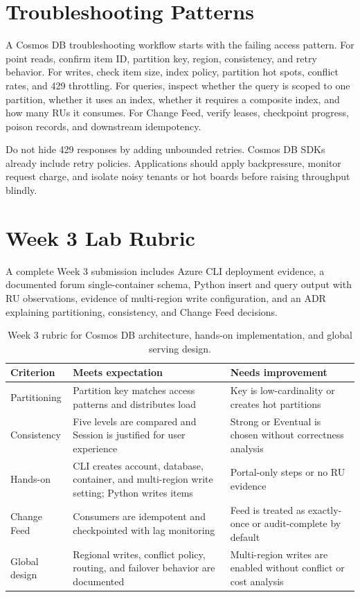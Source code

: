 \section{Troubleshooting Patterns}
A Cosmos DB troubleshooting workflow starts with the failing access pattern. For point reads, confirm item ID, partition key, region, consistency, and retry behavior. For writes, check item size, index policy, partition hot spots, conflict rates, and 429 throttling. For queries, inspect whether the query is scoped to one partition, whether it uses an index, whether it requires a composite index, and how many RUs it consumes. For Change Feed, verify leases, checkpoint progress, poison records, and downstream idempotency.

Do not hide 429 responses by adding unbounded retries. Cosmos DB SDKs already include retry policies. Applications should apply backpressure, monitor request charge, and isolate noisy tenants or hot boards before raising throughput blindly.

\section{Week 3 Lab Rubric}
A complete Week 3 submission includes Azure CLI deployment evidence, a documented forum single-container schema, Python insert and query output with RU observations, evidence of multi-region write configuration, and an ADR explaining partitioning, consistency, and Change Feed decisions.

\begin{table}[H]
\centering
\small
\begin{tabular}{@{}p{3.0cm}p{5.0cm}p{5.0cm}@{}}
\toprule
\textbf{Criterion} & \textbf{Meets expectation} & \textbf{Needs improvement} \\
\midrule
Partitioning & Partition key matches access patterns and distributes load & Key is low-cardinality or creates hot partitions \\
Consistency & Five levels are compared and Session is justified for user experience & Strong or Eventual is chosen without correctness analysis \\
Hands-on & CLI creates account, database, container, and multi-region write setting; Python writes items & Portal-only steps or no RU evidence \\
Change Feed & Consumers are idempotent and checkpointed with lag monitoring & Feed is treated as exactly-once or audit-complete by default \\
Global design & Regional writes, conflict policy, routing, and failover behavior are documented & Multi-region writes are enabled without conflict or cost analysis \\
\bottomrule
\end{tabular}
\caption{Week 3 rubric for Cosmos DB architecture, hands-on implementation, and global serving design.}
\label{tab:week3-rubric}
\end{table}

